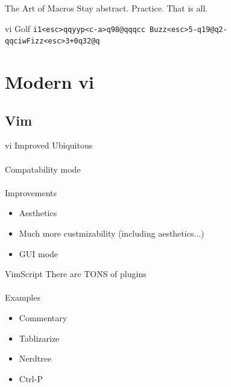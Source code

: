 \documentclass{beamer}
\begin{document}
            \begin{frame}{The Art of Macros}
                Stay abstract. \pause Practice. \pause That is all.
            \end{frame}

            \begin{frame}{vi Golf}
                \texttt{i1<esc>qqyyp<c-a>q98@qqqcc Buzz<esc>5-q19@q2-qqciwFizz<esc>3+0q32@q}
            \end{frame}

    \section{Modern vi}

        \subsection{Vim}

            \begin{frame}{vi Improved}
                Ubiquitous \\~\\
                Compatability mode \\~\\
                Improvements
                \begin{itemize}
                    \item Aesthetics
                    \item Much more custmizability (including aesthetics...)
                    \item GUI mode
                \end{itemize}
            \end{frame}

            \begin{frame}{VimScript}
                There are TONS of plugins \\~\\
                Examples
                \begin{itemize}
                    \item Commentary
                    \item Tablizarize
                    \item Nerdtree
                    \item Ctrl-P
                \end{itemize}
            \end{frame}
\end{document}
